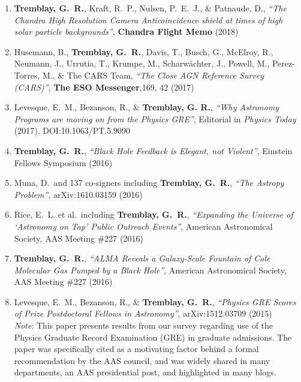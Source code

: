 \documentclass[11pt]{article}
\begin{document}
\begin{enumerate}

\item \textbf{Tremblay, G.~R.}, Kraft, R.~P., Nulsen, P.~E.~J., 
\& Patnaude, D., \textit{``The Chandra High Resolution Camera Anticoincidence shield at times of high solar particle backgrounds''}, \textbf{Chandra Flight Memo} (2018)

\item Husemann, B., \textbf{Tremblay, G.~R.}, Davis, T., Busch, G., McElroy, R., Neumann, J., Urrutia, T., 
Krumpe, M., Scharw\"{a}chter, J., Powell, M., Perez-Torres, M., \& The CARS Team, \textit{``The Close AGN Reference Survey (CARS)''}, \textbf{The ESO Messenger},169, 42 (2017) 

\item Levesque, E.~M., Bezanson, R., \& {\bf Tremblay, G. R.}, 
{\it ``Why Astronomy Programs are moving on from the Physics GRE''}, Editorial in \textit{Physics Today} (2017), DOI:10.1063/PT.5.9090 

\item {\bf Tremblay, G.~R.}, {\it ``Black Hole Feedback is Elegant, not Violent''}, Einstein Fellows Symposium (2016)

\item Muna, D.~and 137 co-signers including \textbf{Tremblay, G.~R.},
{\it ``The Astropy Problem''}, arXiv:1610.03159 (2016)


\item Rice, E.~L. et al.~including {\bf Tremblay, G.~R.}, {\it ``Expanding the Universe of `Astronomy on Tap' Public Outreach Events''}, American Astronomical Society, AAS Meeting \#227 (2016) 


\item {\bf Tremblay, G.~R.}, {\it ``ALMA Reveals a Galaxy-Scale Fountain of Cole Molecular Gas Pumped by a Black Hole''}, American Astronomical Society, AAS Meeting \#227 (2016) 

\item Levesque, E.~M., Bezanson, R., \&  {\bf Tremblay, G.~R.}, {\it ``Physics GRE Scores of Prize Postdoctoral Fellows in Astronomy''}, arXiv:1512.03709 (2015) \\ 
{\it Note}: This paper presents results from our survey regarding
use of the Physics Graduate Record Examination (GRE) in graduate admissions. The paper was specifically cited as a motivating factor behind a formal recommendation by the AAS council, and was widely shared in many departments, an AAS presidential post, and highlighted in many blogs. 



\end{enumerate}
\end{document}
